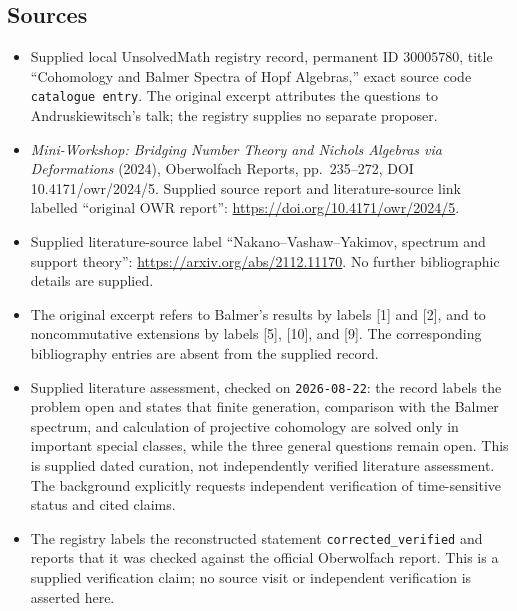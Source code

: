 \documentclass[11pt]{article}
\begin{document}
\subsection{Sources}
\begin{itemize}
\item Supplied local UnsolvedMath registry record, permanent ID \(30005780\), title ``Cohomology and Balmer Spectra of Hopf Algebras,'' exact source code \texttt{catalogue entry}. The original excerpt attributes the questions to Andruskiewitsch's talk; the registry supplies no separate proposer.
\item \emph{Mini-Workshop: Bridging Number Theory and Nichols Algebras via Deformations} (2024), Oberwolfach Reports, pp.~235--272, DOI 10.4171/owr/2024/5. Supplied source report and literature-source link labelled ``original OWR report'': \url{https://doi.org/10.4171/owr/2024/5}.
\item Supplied literature-source label ``Nakano--Vashaw--Yakimov, spectrum and support theory'': \url{https://arxiv.org/abs/2112.11170}. No further bibliographic details are supplied.
\item The original excerpt refers to Balmer's results by labels [1] and [2], and to noncommutative extensions by labels [5], [10], and [9]. The corresponding bibliography entries are absent from the supplied record.
\item Supplied literature assessment, checked on \texttt{2026-08-22}: the record labels the problem open and states that finite generation, comparison with the Balmer spectrum, and calculation of projective cohomology are solved only in important special classes, while the three general questions remain open. This is supplied dated curation, not independently verified literature assessment. The background explicitly requests independent verification of time-sensitive status and cited claims.
\item The registry labels the reconstructed statement \texttt{corrected\_verified} and reports that it was checked against the official Oberwolfach report. This is a supplied verification claim; no source visit or independent verification is asserted here.
\end{itemize}
\end{document}
